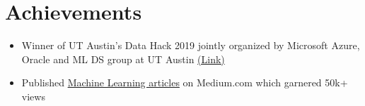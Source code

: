 \documentclass[letterpaper,12pt, margin=2in]{article}
\newcommand{\resumeItem}[1]{
  \item\small{
    {#1 \vspace{-2pt}}
  }
}
\newcommand{\resumeSubHeadingListStart}{\begin{itemize}[leftmargin=0.05in, label={}]}
\newcommand{\resumeSubHeadingListEnd}{\end{itemize}}
\newcommand{\resumeItemListStart}{\begin{itemize}}
\newcommand{\resumeItemListEnd}{\end{itemize}\vspace{-8pt}}
\begin{document}
\section{Achievements}
    \resumeSubHeadingListStart
          \resumeItemListStart
            \resumeItem{Winner of UT Austin’s Data Hack 2019 jointly organized by Microsoft Azure, Oracle and ML DS group at UT Austin \href{https://devpost.com/software/austin-b-cycle}{(Link)}}
            \resumeItem{Published \href{https://medium.com/@animeshgoyal}{Machine Learning articles} on Medium.com which garnered 50k+ views}
          \resumeItemListEnd
    \resumeSubHeadingListEnd

%
\end{document}
